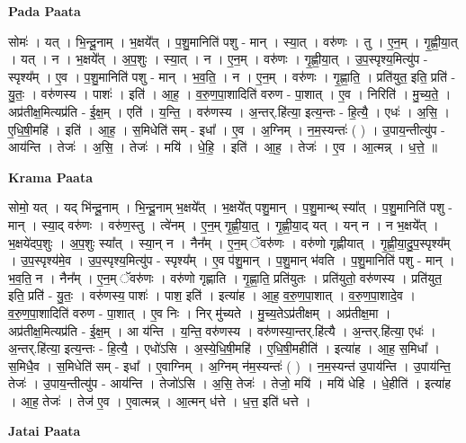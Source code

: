 \documentclass[17pt]{extarticle}
\begin{document}
\textbf{Pada Paata} \newline

सोमः॑ । यत् । भि॒न्दू॒नाम् । भ॒क्षये᳚त् । प॒शु॒मानिति॑ पशु - मान् । स्या॒त् । वरु॑णः । तु । ए॒न॒म् । गृ॒ह्णी॒या॒त् । यत् । न । भ॒क्षये᳚त् । अ॒प॒शुः । स्या॒त् । न । ए॒न॒म् । वरु॑णः । गृ॒ह्णी॒या॒त् । उ॒प॒स्पृश्य॒मित्यु॑प - स्पृश्य᳚म् । ए॒व । प॒शु॒मानिति॑ पशु - मान् । भ॒व॒ति॒ । न । ए॒न॒म् । वरु॑णः । गृ॒ह्णा॒ति॒ । प्रति॑युत॒ इति॒ प्रति॑ - यु॒तः॒ । वरु॑णस्य । पाशः॑ । इति॑ । आ॒ह॒ । व॒रु॒ण॒पा॒शादिति॑ वरुण - पा॒शात् । ए॒व । निरिति॑ । मु॒च्य॒ते॒ । अप्र॑तीक्ष॒मित्यप्र॑ति - ई॒क्ष॒म् । एति॑ । य॒न्ति॒ । वरु॑णस्य । अ॒न्तर्.हि॑त्या॒ इत्य॒न्तः - हि॒त्यै॒ । एधः॑ । अ॒सि॒ । ए॒धि॒षी॒महि॑ । इति॑ । आ॒ह॒ । स॒मिधेति॑ सम् - इधा᳚ । ए॒व । अ॒ग्निम् । न॒म॒स्यन्तः॑ ( ) । उ॒पाय॒न्तीत्यु॑प - आय॑न्ति । तेजः॑ । अ॒सि॒ । तेजः॑ । मयि॑ । धे॒हि॒ । इति॑ । आ॒ह॒ । तेजः॑ । ए॒व । आ॒त्मन्न् । ध॒त्ते॒ ॥  \newline


\textbf{Krama Paata} \newline

सोमो॒ यत् । यद् भि॑न्दू॒नाम् । भि॒न्दू॒नाम् भ॒क्षये᳚त् । भ॒क्षये᳚त् पशु॒मान् । प॒शु॒मान्थ् स्या᳚त् । प॒शु॒मानिति॑ पशु - मान् । स्या॒द् वरु॑णः । वरु॑ण॒स्तु । त्वे॑नम् । ए॒न॒म् गृ॒ह्णी॒या॒त्॒ । गृ॒ह्णी॒या॒द् यत् । यन् न । न भ॒क्षये᳚त् । भ॒क्षये॑दप॒शुः । अ॒प॒शुः स्या᳚त् । स्या॒न् न । नैन᳚म् । ए॒न॒म् ॅवरु॑णः । वरु॑णो गृह्णीयात् । गृ॒ह्णी॒या॒दु॒प॒स्पृश्य᳚म् । उ॒प॒स्पृश्य॑मे॒व । उ॒प॒स्पृश्य॒मित्यु॑प - स्पृश्य᳚म् । ए॒व प॑शु॒मान् । प॒शु॒मान् भ॑वति । प॒शु॒मानिति॑ पशु - मान् । भ॒व॒ति॒ न । नैन᳚म् । ए॒न॒म् ॅवरु॑णः । वरु॑णो गृह्णाति । गृ॒ह्णा॒ति॒ प्रति॑युतः । प्रति॑युतो॒ वरु॑णस्य । प्रति॑युत॒ इति॒ प्रति॑ - यु॒तः॒ । वरु॑णस्य॒ पाशः॑ । पाश॒ इति॑ । इत्या॑ह । आ॒ह॒ व॒रु॒ण॒पा॒शात् । व॒रु॒ण॒पा॒शादे॒व । व॒रु॒ण॒पा॒शादिति॑ वरुण - पा॒शात् । ए॒व निः । निर् मु॑च्यते । मु॒च्य॒तेऽप्र॑तीक्षम् । अप्र॑तीक्ष॒मा । अप्र॑तीक्ष॒मित्यप्र॑ति - ई॒क्ष॒म् । आ य॑न्ति । य॒न्ति॒ वरु॑णस्य । वरु॑णस्या॒न्तर्.हि॑त्यै । अ॒न्तर्.हि॑त्या॒ एधः॑ । अ॒न्तर्.हि॑त्या॒ इत्य॒न्तः - हि॒त्यै॒ । एधो॑ऽसि । अ॒स्ये॒धि॒षी॒महि॑ । ए॒धि॒षी॒महीति॑ । इत्या॑ह । आ॒ह॒ स॒मिधा᳚ । स॒मिधै॒व । स॒मिधेति॑ सम् - इधा᳚ । ए॒वाग्निम् । अ॒ग्निम् न॑म॒स्यन्तः॑ ( ) । न॒म॒स्यन्त॑ उ॒पाय॑न्ति । उ॒पाय॑न्ति॒ तेजः॑ । उ॒पाय॒न्तीत्यु॑प - आय॑न्ति । तेजो॑ऽसि । अ॒सि॒ तेजः॑ । तेजो॒ मयि॑ । मयि॑ धेहि । धे॒हीति॑ । इत्या॑ह । आ॒ह॒ तेजः॑ । तेज॑ ए॒व । ए॒वात्मन्न् । आ॒त्मन् ध॑त्ते । ध॒त्त॒ इति॑ धत्ते । \newline

\textbf{Jatai Paata} \newline
\end{document}
